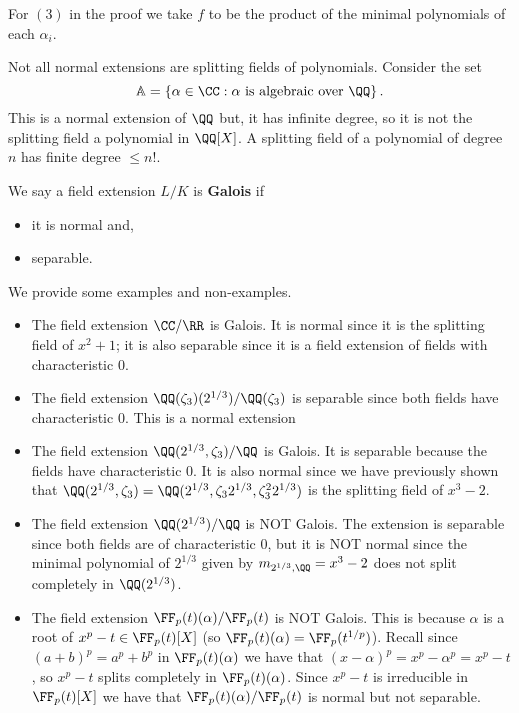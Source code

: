\documentclass[12pt, a4paper]{article}
\begin{document}
\begin{mdremark}
    For \((3)\) in the proof we take \(f\) to be the product of the minimal polynomials of each \(\alpha_i\).
\end{mdremark}

\begin{mdexample}[IMPORTANT]
    Not all normal extensions are splitting fields of polynomials. Consider the set 
    \[\mathbb{A}=\left\{ \alpha \in \CC : \alpha \text{ is algebraic over \(\QQ\)} \right\}.\]
    This is a normal extension of \(\QQ\) but, it has infinite degree, so it is not the splitting field a polynomial in \(\QQ[X]\). A splitting field of a polynomial of degree \(n\) has finite degree \(\leq n!\).
\end{mdexample}

\begin{definition}
    We say a field extension \(L/K\) is \textbf{Galois} if
    \begin{itemize}
        \item it is normal and,
        \item separable.
    \end{itemize}
\end{definition}

\begin{mdexample}
    We provide some examples and non-examples.
    \begin{itemize}
        \item The field extension \(\CC/\RR\) is Galois. It is normal since it is the splitting field of \(x^2+1\); it is also separable since it is a field extension of fields with characteristic \(0\). 
        \item The field extension \(\QQ(\zeta_3)(2^{1/3})/\QQ(\zeta_3)\) is separable since both fields have characteristic \(0\). This is a normal extension 
        \item The field extension \(\QQ(2^{1/3},\zeta_3)/\QQ\) is Galois. It is separable because the fields have characteristic \(0\). It is also normal since we have previously shown that \(\QQ(2^{1/3},\zeta_3)=\QQ(2^{1/3},\zeta_3 2^{1/3},\zeta_3^2 2^{1/3})\) is the splitting field of \(x^3-2\). 
        \item The field extension \(\QQ(2^{1/3})/\QQ\) is NOT Galois. The extension is separable since both fields are of characteristic \(0\), but it is NOT normal since the minimal polynomial of \(2^{1/3}\) given by \(m_{2^{1/3},\QQ}=x^3-2\) does not split completely in \(\QQ(2^{1/3})\).
        \item The field extension \(\FF_p(t)(\alpha)/\FF_p(t)\) is NOT Galois. This is because \(\alpha\) is a root of \(x^p-t\in \FF_p(t)[X]\) (so \(\FF_p(t)(\alpha)=\FF_p(t^{1/p})\)). Recall since \((a+b)^p=a^p+b^p\) in \(\FF_p(t)(\alpha)\) we have that \((x-\alpha)^p=x^p-\alpha^p=x^p-t\), so \(x^p-t\) splits completely in \(\FF_p(t)(\alpha)\). Since \(x^p-t\) is irreducible in \(\FF_p(t)[X]\) we have that \(\FF_p(t)(\alpha)/\FF_p(t)\) is normal but not separable.
    \end{itemize}
\end{mdexample}
\end{document}
